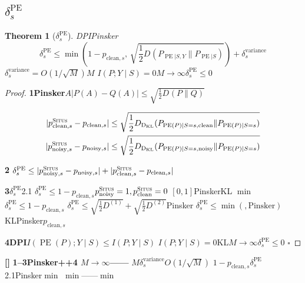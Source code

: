 \documentclass[11pt,a4paper]{article}
\newtheorem{theorem}{Theorem}[section]
\theoremstyle{remark}
\DeclareMathOperator{\PE}{PE}
\DeclareMathOperator{\KL}{D_{KL}}
\newcommand{\Situs}{\textsc{Situs}}
\newcommand{\rigorous}{\textnormal{\textbf{[]}}}
\begin{document}
\subsection{$\delta_s^{\PE}$}

\begin{theorem}[$\delta_s^{\PE}$]
\label{thm:2.3.1}
DPIPinsker
\begin{equation}
    \boxed{
    \delta_s^{\PE} \leq \min\!\left(1 - p_{\text{clean}, s},\,
    \sqrt{\frac{1}{2} D_{\KL}(P_{\PE|S,Y} \| P_{\PE|S})}\right)
    + \delta_s^{\text{variance}}
    }
\end{equation}
$\delta_s^{\text{variance}} = O(1/\sqrt{M})$$M$
$I(P; Y \mid S) = 0$$M \to \infty$$\delta_s^{\PE} \leq 0$
\end{theorem}

\begin{proof}
\textbf{1Pinsker}$A$$|P(A) - Q(A)| \leq \sqrt{\frac{1}{2}D_{\KL}(P\|Q)}$

\begin{align}
    |p_{\text{clean}, s}^{\Situs} - p_{\text{clean}, s}|
    &\leq \sqrt{\frac{1}{2} D_{\KL}(P_{\PE(P)|S=s, \text{clean}} \| P_{\PE(P)|S=s})}\\
    |p_{\text{noisy}, s}^{\Situs} - p_{\text{noisy}, s}|
    &\leq \sqrt{\frac{1}{2} D_{\KL}(P_{\PE(P)|S=s, \text{noisy}} \| P_{\PE(P)|S=s})}
\end{align}

\textbf{2}
$\delta_s^{\PE} \leq |p_{\text{noisy}, s}^{\Situs} - p_{\text{noisy}, s}|
                      + |p_{\text{clean}, s}^{\Situs} - p_{\text{clean}, s}|$

\textbf{3}$\delta_s^{\PE}$2.1
$\delta_s^{\PE} \leq 1 - p_{\text{clean}, s}$$p_{\text{noisy}}^{\Situs}=1, p_{\text{clean}}^{\Situs}=0$
$[0,1]$PinskerKL
$\min$\textbf{}
$\delta_s^{\PE} \leq 1-p_{\text{clean},s}$
$\delta_s^{\PE} \leq \sqrt{\frac{1}{2}D_{\KL}^{(1)}} + \sqrt{\frac{1}{2}D_{\KL}^{(2)}}$Pinsker
$\delta_s^{\PE} \leq \min(\text{}, \text{Pinsker})$
KLPinsker$p_{\text{clean},s}$

\textbf{4DPI}$I(\PE(P); Y \mid S) \leq I(P; Y \mid S)$
$I(P; Y \mid S) = 0$KL$M \to \infty$$\delta_s^{\PE} \leq 0$
\hfill $\square$
\end{proof}

\rigorous{} \textbf{1--3Pinsker++4
$M \to \infty$——}
$M$$\delta_s^{\text{variance}}$$O(1/\sqrt{M})$
\textbf{}$1-p_{\text{clean},s}$$\delta_s^{\PE}$
2.1Pinsker$\min$\textbf{}
$\min$——$\min$
\end{document}

